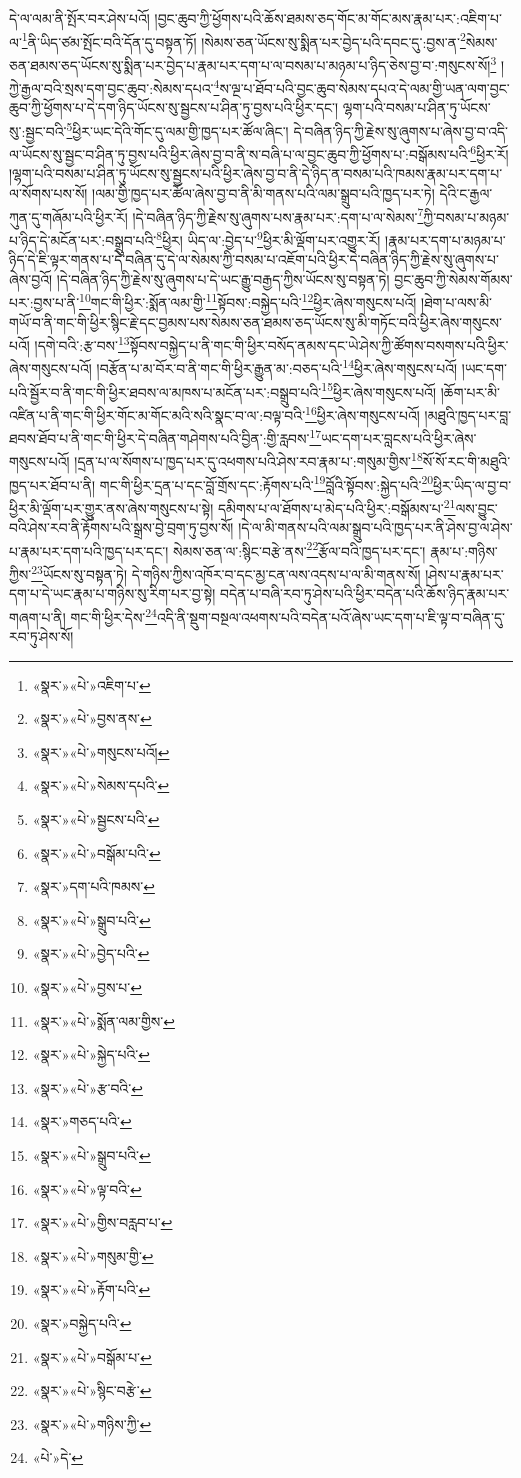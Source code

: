 དེ་ལ་ལམ་ནི་སྤོར་བར་ཤེས་པའོ། །བྱང་ཆུབ་ཀྱི་ཕྱོགས་པའི་ཆོས་ཐམས་ཅད་གོང་མ་གོང་མས་རྣམ་པར་:འཇིག་པ་ལ་\footnote{«སྣར་»«པེ་»འཇིག་པ་}ནི་ཡིད་ཙམ་སྤོང་བའི་དོན་དུ་བསྟན་ཏོ། །སེམས་ཅན་ཡོངས་སུ་སྨིན་པར་བྱེད་པའི་དབང་དུ་:བྱས་ན་\footnote{«སྣར་»«པེ་»བྱས་ནས་}སེམས་ཅན་ཐམས་ཅད་ཡོངས་སུ་སྨིན་པར་བྱེད་པ་རྣམ་པར་དག་པ་ལ་བསམ་པ་མཉམ་པ་ཉིད་ཅེས་བྱ་བ་:གསུངས་སོ།\footnote{«སྣར་»«པེ་»གསུངས་པའོ།} །ཀྱེ་རྒྱལ་བའི་སྲས་དག་བྱང་ཆུབ་:སེམས་དཔའ་\footnote{«སྣར་»«པེ་»སེམས་དཔའི་}ས་ལྔ་པ་ཐོབ་པའི་བྱང་ཆུབ་སེམས་དཔའ་དེ་ལམ་གྱི་ཡན་ལག་བྱང་ཆུབ་ཀྱི་ཕྱོགས་པ་དེ་དག་ཉིད་ཡོངས་སུ་སྦྱངས་པ་ཤིན་ཏུ་བྱས་པའི་ཕྱིར་དང་། ལྷག་པའི་བསམ་པ་ཤིན་ཏུ་ཡོངས་སུ་:སྦྱང་བའི་\footnote{«སྣར་»«པེ་»སྦྱངས་པའི་}ཕྱིར་ཡང་དེའི་གོང་དུ་ལམ་གྱི་ཁྱད་པར་ཚོལ་ཞིང་། དེ་བཞིན་ཉིད་ཀྱི་རྗེས་སུ་ཞུགས་པ་ཞེས་བྱ་བ་འདི་ལ་ཡོངས་སུ་སྦྱང་བ་ཤིན་ཏུ་བྱས་པའི་ཕྱིར་ཞེས་བྱ་བ་ནི་ས་བཞི་པ་ལ་བྱང་ཆུབ་ཀྱི་ཕྱོགས་པ་:བསྒོམས་པའི་\footnote{«སྣར་»«པེ་»བསྒོམ་པའི་}ཕྱིར་རོ། །ལྷག་པའི་བསམ་པ་ཤིན་ཏུ་ཡོངས་སུ་སྦྱངས་པའི་ཕྱིར་ཞེས་བྱ་བ་ནི་དེ་ཉིད་ན་བསམ་པའི་ཁམས་རྣམ་པར་དག་པ་ལ་སོགས་པས་སོ། །ལམ་གྱི་ཁྱད་པར་ཚོལ་ཞེས་བྱ་བ་ནི་མི་གནས་པའི་ལམ་སྒྲུབ་པའི་ཁྱད་པར་ཏེ། དེའི་ང་རྒྱལ་ཀུན་དུ་གཞོམ་པའི་ཕྱིར་རོ། །དེ་བཞིན་ཉིད་ཀྱི་རྗེས་སུ་ཞུགས་པས་རྣམ་པར་:དག་པ་ལ་སེམས་\footnote{«སྣར་»དག་པའི་ཁམས་}ཀྱི་བསམ་པ་མཉམ་པ་ཉིད་དེ་མངོན་པར་:བསྒྲུབ་པའི་\footnote{«སྣར་»«པེ་»སྒྲུབ་པའི་}ཕྱིར། ཡིད་ལ་:བྱེད་པ་\footnote{«སྣར་»«པེ་»བྱེད་པའི་}ཕྱིར་མི་ལྡོག་པར་འགྱུར་རོ། །རྣམ་པར་དག་པ་མཉམ་པ་ཉིད་དེ་ཇི་ལྟར་གནས་པ་དེ་བཞིན་དུ་དེ་ལ་སེམས་ཀྱི་བསམ་པ་འཇོག་པའི་ཕྱིར་དེ་བཞིན་ཉིད་ཀྱི་རྗེས་སུ་ཞུགས་པ་ཞེས་བྱའོ། །དེ་བཞིན་ཉིད་ཀྱི་རྗེས་སུ་ཞུགས་པ་དེ་ཡང་རྒྱུ་བརྒྱད་ཀྱིས་ཡོངས་སུ་བསྟན་ཏེ། བྱང་ཆུབ་ཀྱི་སེམས་གོམས་པར་:བྱས་པ་ནི་\footnote{«སྣར་»«པེ་»བྱས་པ་}གང་གི་ཕྱིར་:སྨོན་ལམ་གྱི་\footnote{«སྣར་»«པེ་»སྨོན་ལམ་གྱིས་}སྟོབས་:བསྐྱེད་པའི་\footnote{«སྣར་»«པེ་»སྐྱེད་པའི་}ཕྱིར་ཞེས་གསུངས་པའོ། །ཐེག་པ་ལས་མི་གཡོ་བ་ནི་གང་གི་ཕྱིར་སྙིང་རྗེ་དང་བྱམས་པས་སེམས་ཅན་ཐམས་ཅད་ཡོངས་སུ་མི་གཏོང་བའི་ཕྱིར་ཞེས་གསུངས་པའོ། །དགེ་བའི་:རྩ་བས་\footnote{«སྣར་»«པེ་»རྩ་བའི་}སྟོབས་བསྐྱེད་པ་ནི་གང་གི་ཕྱིར་བསོད་ནམས་དང་ཡེ་ཤེས་ཀྱི་ཚོགས་བསགས་པའི་ཕྱིར་ཞེས་གསུངས་པའོ། །བརྩོན་པ་མ་བོར་བ་ནི་གང་གི་ཕྱིར་རྒྱུན་མ་:བཅད་པའི་\footnote{«སྣར་»གཅད་པའི་}ཕྱིར་ཞེས་གསུངས་པའོ། །ཡང་དག་པའི་སྦྱོར་བ་ནི་གང་གི་ཕྱིར་ཐབས་ལ་མཁས་པ་མངོན་པར་:བསྒྲུབ་པའི་\footnote{«སྣར་»«པེ་»སྒྲུབ་པའི་}ཕྱིར་ཞེས་གསུངས་པའོ། །ཆོག་པར་མི་འཛིན་པ་ནི་གང་གི་ཕྱིར་གོང་མ་གོང་མའི་སའི་སྣང་བ་ལ་:བལྟ་བའི་\footnote{«སྣར་»«པེ་»ལྟ་བའི་}ཕྱིར་ཞེས་གསུངས་པའོ། །མཐུའི་ཁྱད་པར་བླ་ཐབས་ཐོབ་པ་ནི་གང་གི་ཕྱིར་དེ་བཞིན་གཤེགས་པའི་བྱིན་:གྱི་རླབས་\footnote{«སྣར་»«པེ་»གྱིས་བརླབ་པ་}ཡང་དག་པར་བླངས་པའི་ཕྱིར་ཞེས་གསུངས་པའོ། །དྲན་པ་ལ་སོགས་པ་ཁྱད་པར་དུ་འཕགས་པའི་ཤེས་རབ་རྣམ་པ་:གསུམ་གྱིས་\footnote{«སྣར་»«པེ་»གསུམ་གྱི་}སོ་སོ་རང་གི་མཐུའི་ཁྱད་པར་ཐོབ་པ་ནི། གང་གི་ཕྱིར་དྲན་པ་དང་བློ་གྲོས་དང་:རྟོགས་པའི་\footnote{«སྣར་»«པེ་»རྟོག་པའི་}བློའི་སྟོབས་:སྐྱེད་པའི་\footnote{«སྣར་»བསྐྱེད་པའི་}ཕྱིར་ཡིད་ལ་བྱ་བ་ཕྱིར་མི་ལྡོག་པར་གྱུར་ནས་ཞེས་གསུངས་པ་སྟེ། དམིགས་པ་ལ་ཐོགས་པ་མེད་པའི་ཕྱིར་:བསྒོམས་པ་\footnote{«སྣར་»«པེ་»བསྒོམ་པ་}ལས་བྱུང་བའི་ཤེས་རབ་ནི་རྟོགས་པའི་སྒྲས་བྱེ་བྲག་ཏུ་བྱས་སོ། །དེ་ལ་མི་གནས་པའི་ལམ་སྒྲུབ་པའི་ཁྱད་པར་ནི་ཤེས་བྱ་ལ་ཤེས་པ་རྣམ་པར་དག་པའི་ཁྱད་པར་དང་། སེམས་ཅན་ལ་:སྙིང་བརྩེ་ནས་\footnote{«སྣར་»«པེ་»སྙིང་བརྩེ་}རྩོལ་བའི་ཁྱད་པར་དང་། རྣམ་པ་:གཉིས་ཀྱིས་\footnote{«སྣར་»«པེ་»གཉིས་ཀྱི་}ཡོངས་སུ་བསྟན་ཏེ། དེ་གཉིས་ཀྱིས་འཁོར་བ་དང་མྱ་ངན་ལས་འདས་པ་ལ་མི་གནས་སོ། །ཤེས་པ་རྣམ་པར་དག་པ་དེ་ཡང་རྣམ་པ་གཉིས་སུ་རིག་པར་བྱ་སྟེ། བདེན་པ་བཞི་རབ་ཏུ་ཤེས་པའི་ཕྱིར་བདེན་པའི་ཆོས་ཉིད་རྣམ་པར་གཞག་པ་ནི། གང་གི་ཕྱིར་དེས་\footnote{«པེ་»དེ་}འདི་ནི་སྡུག་བསྔལ་འཕགས་པའི་བདེན་པའོ་ཞེས་ཡང་དག་པ་ཇི་ལྟ་བ་བཞིན་དུ་རབ་ཏུ་ཤེས་སོ། 